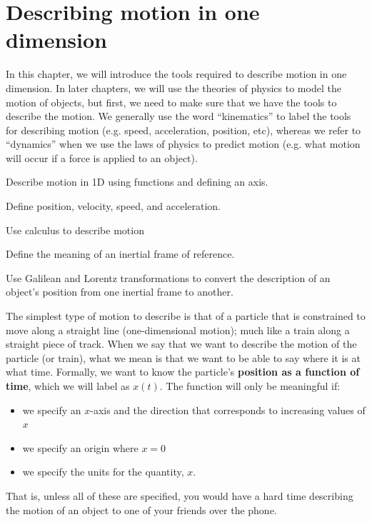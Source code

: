 %
\chapter{Describing motion in one dimension}
\label{chap:3_Kinematics1D}
In this chapter, we will introduce the tools required to describe motion in one dimension. In later chapters, we will use the theories of physics to model the motion of objects, but first, we need to make sure that we have the tools to describe the motion. We generally use the word ``kinematics'' to label the tools for describing motion (e.g. speed, acceleration, position, etc), whereas we refer to ``dynamics'' when we use the laws of physics to predict motion (e.g. what motion will occur if a force is applied to an object). 
 \vspace{1cm}
\begin{learningObjectives}
\item Describe motion in 1D using functions and defining an axis.
\item Define position, velocity, speed, and acceleration.
\item Use calculus to describe motion
\item Define the meaning of an inertial frame of reference.
\item Use Galilean and Lorentz transformations to convert the description of an object's position from one inertial frame to another.
\end{learningObjectives}


The simplest type of motion to describe is that of a particle that is constrained to move along a straight line (one-dimensional motion); much like a train along a straight piece of track. When we say that we want to describe the motion of the particle (or train), what we mean is that we want to be able to say where it is at what time. Formally, we want to know the particle's \textbf{position as a function of time}, which we will label as $x(t)$. The function will only be meaningful if:
\begin{itemize}
\item we specify an $x$-axis and the direction that corresponds to increasing values of $x$
\item we specify an origin where $x=0$
\item we specify the units for the quantity, $x$.
\end{itemize}
That is, unless all of these are specified, you would have a hard time describing the motion of an object to one of your friends over the phone. 

